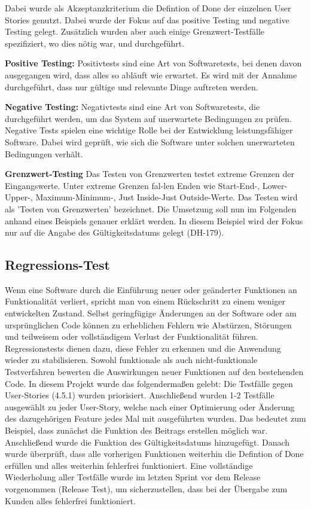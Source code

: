 Dabei wurde als Akzeptanzkriterium die Defintion of Done der einzelnen User Stories genutzt. Dabei wurde der Fokus auf das positive Testing und negative Testing gelegt. Zusätzlich wurden aber auch einige Grenzwert-Testfälle spezifiziert, wo dies nötig war, und durchgeführt.

\textbf{Positive Testing:}
Positivtests sind eine Art von Softwaretests, bei denen davon ausgegangen wird, dass alles so abläuft wie erwartet. Es wird mit der Annahme durchgeführt, dass nur gültige und relevante Dinge auftreten werden.

\textbf{Negative Testing:}
Negativtests sind eine Art von Softwaretests, die durchgeführt werden, um das System auf unerwartete Bedingungen zu prüfen. Negative Tests spielen eine wichtige Rolle bei der Entwicklung leistungsfähiger Software. Dabei wird geprüft, wie sich die Software unter solchen unerwarteten Bedingungen verhält.

\textbf{Grenzwert-Testing}
Das Testen von Grenzwerten testet extreme Grenzen der Eingangswerte. Unter extreme Grenzen fal-len Enden wie Start-End-, Lower-Upper-, Maximum-Minimum-, Just Inside-Just Outside-Werte. Das Testen wird als 'Testen von Grenzwerten' bezeichnet.
Die Umsetzung soll nun im Folgenden anhand eines Beispiels genauer erklärt werden. In diesem Beispiel wird der Fokus nur auf die Angabe des Gültigkeitsdatums gelegt (DH-179).

\subsection{Regressions-Test}
\label{sub:UmsetzungTestRegression}

Wenn eine Software durch die Einführung neuer oder geänderter Funktionen an Funktionalität verliert, spricht man von einem Rückschritt zu einem weniger entwickelten Zustand. Selbst geringfügige Änderungen an der Software oder am ursprünglichen Code können zu erheblichen Fehlern wie Abstürzen, Störungen und teilweisem oder vollständigem Verlust der Funktionalität führen.
Regressionstests dienen dazu, diese Fehler zu erkennen und die Anwendung wieder zu stabilisieren. Sowohl funktionale als auch nicht-funktionale Testverfahren bewerten die Auswirkungen neuer Funktionen auf den bestehenden Code.
In diesem Projekt wurde das folgendermaßen gelebt: Die Testfälle gegen User-Stories (4.5.1) wurden priorisiert. Anschließend wurden 1-2 Testfälle ausgewählt zu jeder User-Story, welche nach einer Optimierung oder Änderung des dazugehörigen Feature jedes Mal mit ausgeführten wurden. Das bedeutet zum Beispiel, dass zunächst die Funktion des Beitrags erstellen möglich war. Anschließend wurde die Funktion des Gültigkeitsdatums hinzugefügt. Danach wurde überprüft, dass alle vorherigen Funktionen weiterhin die Defintion of Done erfüllen und alles weiterhin fehlerfrei funktioniert.
Eine vollständige Wiederholung aller Testfälle wurde im letzten Sprint vor dem Release vorgenommen (Release Test), um sicherzustellen, dass bei der Übergabe zum Kunden alles fehlerfrei funktioniert.


